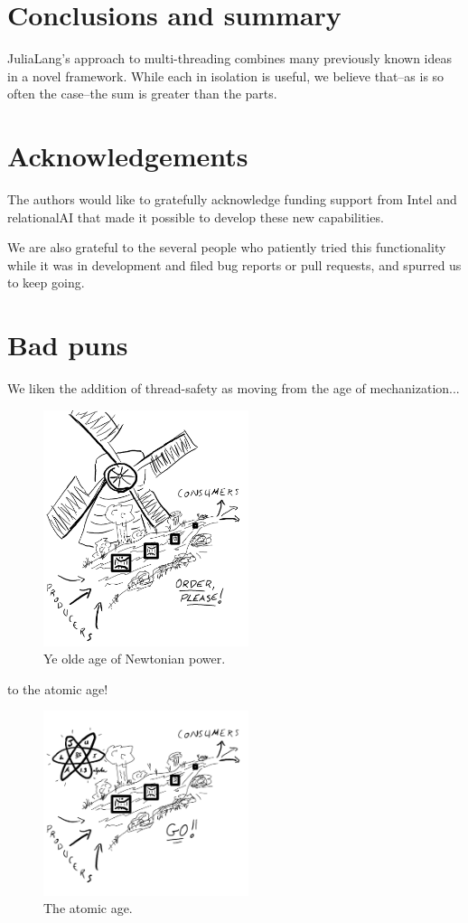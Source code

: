\documentclass{juliacon}
\begin{document}
\section{Conclusions and summary}
\label{subsub:conclusion}

JuliaLang's approach to multi-threading combines many previously known ideas in a novel framework. While each in isolation is useful, we believe that--as is so often the case--the sum is greater than the parts.

\section{Acknowledgements}
\label{subsub:acknowledgements}

The authors would like to gratefully acknowledge funding support from Intel and relationalAI that made it possible to develop these new capabilities.

We are also grateful to the several people who patiently tried this functionality while it was in development and filed bug reports or pull requests, and spurred us to keep going.


\section{Bad puns}
\label{subsub:puns}

We liken the addition of thread-safety as moving from the age of mechanization...

\begin{figure}[h]
\centerline{\includegraphics[width=6cm]{images/threads_windmill.png}}
\caption{Ye olde age of Newtonian power.}
\label{fig:windmill}
\end{figure}

to the atomic age!

\begin{figure}[h]
\centerline{\includegraphics[width=6cm]{images/threads_atomic.png}}
\caption{The atomic age.}
\label{fig:atomic}
\end{figure}
\end{document}
